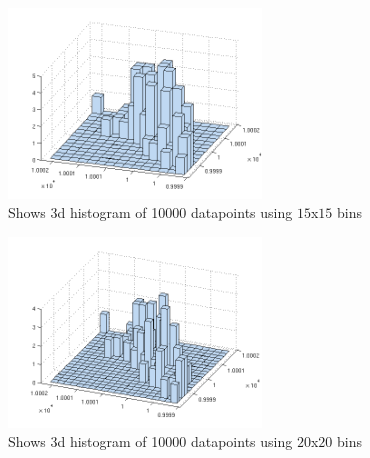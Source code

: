 \documentclass[a4paper, 10pt, final]{article}
\begin{document}
\begin{figure}[!ht]
\centering
\includegraphics[width=0.6\textwidth]{images/q1_4_10000_b15}
\caption{Shows 3d histogram of 10000 datapoints using $15$x$15$ bins}
\label{fig:q1_4_10000_b15}
\end{figure}

\begin{figure}[!ht]
\centering
\includegraphics[width=0.6\textwidth]{images/q1_4_10000_b20}
\caption{Shows 3d histogram of 10000 datapoints using $20$x$20$ bins}
\label{fig:q1_4_10000_b20}
\end{figure}



\newpage
\subsection*{\label{text:Code}}




%
%
\end{document}
